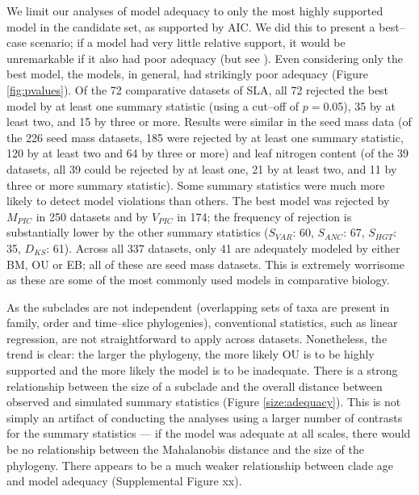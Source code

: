 \documentclass[a4paper,12pt]{article}
\begin{document}
We limit our analyses of model adequacy to only the most highly supported model in the candidate set, as supported by AIC. We did this to present a best--case scenario; if a model had very little relative support, it would be unremarkable if it also had poor adequacy (but see \citep{Ripplinger2010}). Even considering only the best model, the models, in general, had strikingly poor adequacy (Figure \ref{fig:pvalues}). 
Of the 72 comparative datasets of SLA, all 72 rejected the best model by at least one summary statistic (using a cut--off of $p=$0.05), 35 by at least two, and 15 by three or more. 
Results were similar in the seed mass data (of the 226 seed mass datasets, 185 were rejected by at least one summary statistic, 120 by at least two and 64 by three or more) and leaf nitrogen content 
(of the 39 datasets, all 39 could be rejected by at least one, 21 by at least two, and 11 by three or more summary statistic). 
Some summary statistics were much more likely to detect model violations than others. The best model was rejected by $M_{PIC}$ in 250 datasets and by $V_{PIC}$ in 174; the frequency of rejection is substantially lower by the other summary statistics ($S_{VAR}$: 60, $S_{ANC}$: 67, $S_{HGT}$: 35, $D_{KS}$: 61). 
Across all 337 datasets, only 41 are adequately modeled by either BM, OU or EB; all of these are seed mass datasets. This is extremely worrisome as these are some of the most commonly used models in comparative biology. 

As the subclades are not independent (overlapping sets of taxa are present in family, order and time--slice phylogenies), conventional statistics, such as linear regression, are not straightforward to apply across datasets. Nonetheless, the trend is clear: the larger the phylogeny, the more likely OU is to be highly supported and the more likely the model is to be inadequate. There is a strong relationship between the size of a subclade and the overall distance between observed and simulated summary statistics (Figure \ref{size:adequacy}). This is not simply an artifact of conducting the analyses using a larger number of contrasts for the summary statistics --- if the model was adequate at all scales, there would be no relationship between the Mahalanobis distance and the size of the phylogeny. There appears to be a much weaker relationship between clade age and model adequacy (Supplemental Figure xx).
\end{document}

